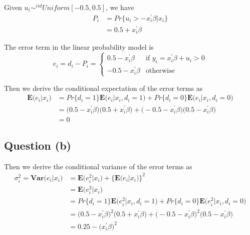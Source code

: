 \documentclass{article}
\begin{document}
Given $u_i \sim^{iid} Uniform[-0.5, 0.5]$, we have 
\begin{equation}
\begin{split}
P_i & = Pr\bigg\{ u_i > - x_i^\prime \beta \bigg| x_i \bigg\} \\
& = 0.5 + x_i^\prime \beta
\end{split}
\end{equation}

The error term in the linear probability model is
\begin{equation*}
e_i = d_i - P_i =
\begin{cases}
0.5 - x_i^\prime \beta & \text{if  } y_i = x_i^\prime \beta + u_i > 0 \\
-0.5 - x_i^\prime \beta & \text{otherwise  } 
\end{cases}
\end{equation*}

Then we derive the conditional expectation of the error terms as 
\begin{equation*}
\begin{split}
\pmb{E}\bigg(e_i \bigg| x_i\bigg) & = Pr\bigg\{ d_i = 1 \bigg\} \pmb{E}\bigg(e_i \bigg| x_i, d_i = 1\bigg)  + Pr\bigg\{ d_i = 0 \bigg\} \pmb{E}\bigg(e_i \bigg| x_i, d_i = 0\bigg)\\
& = \bigg( 0.5 - x_i^\prime \beta \bigg) \bigg( 0.5 + x_i^\prime \beta \bigg) + \bigg(-0.5 - x_i^\prime \beta \bigg) \bigg( 0.5 - x_i^\prime \beta \bigg) \\
& = 0
\end{split}
\end{equation*}

\subsection*{Question (b)}
Then we derive the conditional variance of the error terms as 
\begin{equation}
\begin{split}
\sigma_i^2 = \pmb{Var}\bigg(e_i \bigg| x_i\bigg) & = \pmb{E} \bigg(e_i^2 \bigg| x_i\bigg) + \Bigg\{ \pmb{E} \bigg(e_i \bigg| x_i\bigg) \Bigg\}^2\\
& = \pmb{E} \bigg(e_i^2 \bigg| x_i\bigg) \\
& = Pr\bigg\{ d_i = 1 \bigg\} \pmb{E}\bigg(e_i^2 \bigg| x_i, d_i = 1\bigg)  + Pr\bigg\{ d_i = 0 \bigg\} \pmb{E}\bigg(e_i^2 \bigg| x_i, d_i = 0\bigg)\\
& = \bigg( 0.5 - x_i^\prime \beta \bigg)^2 \bigg( 0.5 + x_i^\prime \beta \bigg) + \bigg(-0.5 - x_i^\prime \beta \bigg)^2 \bigg( 0.5 - x_i^\prime \beta \bigg) \\
& = 0.25 - \bigg(x_i^\prime \beta \bigg)^2
\end{split}
\end{equation}
\end{document}
